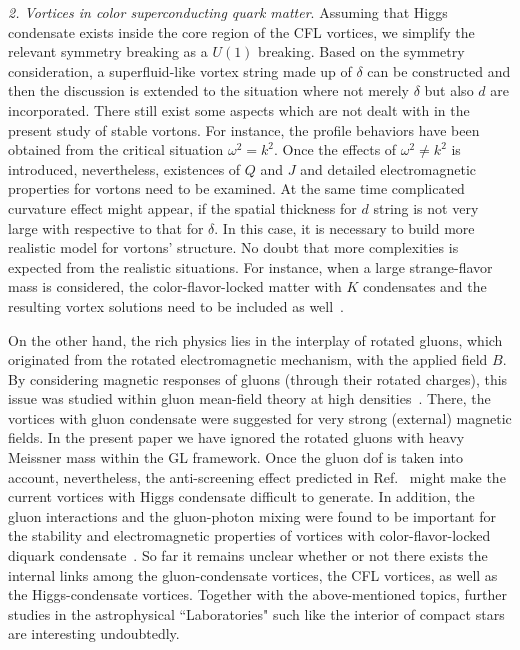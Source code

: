 \documentclass[12pt]{article}
\begin{document}
\emph{2. Vortices in color superconducting quark matter}. Assuming that Higgs condensate exists inside the core 
region of the CFL vortices, we simplify the relevant symmetry breaking as a $U(1)$ breaking. Based on the symmetry 
consideration, a superfluid-like vortex string made up of $\delta$ can be constructed and then the discussion is 
extended to the situation where not merely $\delta$ but also $d$ are incorporated.
There still exist some aspects which are not dealt with in the present study of stable vortons.
For instance, the profile behaviors have been obtained from the critical situation $\omega^2 = k^2$.
Once the effects of $\omega^2\neq k^2$ is introduced, nevertheless, existences of $Q$ and $J$ and 
detailed electromagnetic properties for vortons need to be examined.
At the same time complicated curvature effect might appear, if the spatial thickness for $d$ string 
is not very large with respective to that for $\delta$. In this case, it is necessary to build more 
realistic model for vortons' structure.
No doubt that more complexities is expected from the realistic situations. 
For instance, when a large strange-flavor mass is considered, the color-flavor-locked matter with $K$ 
condensates and the resulting vortex solutions need to be included as well~\cite{kaplan2002charged,buckley2002superconducting}.

On the other hand, the rich physics lies in the interplay of rotated gluons, which originated 
from the rotated electromagnetic mechanism, with the applied field $B$.
By considering magnetic responses of gluons (through their rotated charges), this issue was studied 
within gluon mean-field theory at high densities~\cite{ferrer2006magnetic}.
There, the vortices with gluon condensate were suggested for very strong (external) magnetic fields.
In the present paper we have ignored the rotated gluons with heavy Meissner mass within the GL framework.
Once the gluon dof is taken into account, nevertheless, the anti-screening effect predicted in 
Ref.~\cite{ferrer2006magnetic} might make the current vortices with 
Higgs condensate difficult to generate.
In addition, the gluon interactions and the gluon-photon mixing were found to be important for the 
stability and electromagnetic properties of vortices with color-flavor-locked diquark condensate~\cite{vinci2012spontaneous,eto2010instabilities,iida2005magnetic}.
So far it remains unclear whether or not there exists the internal links among the gluon-condensate vortices, 
the CFL vortices, as well as the Higgs-condensate vortices. Together with the above-mentioned topics, further 
studies in the astrophysical ``Laboratories" such like the interior of compact stars are interesting undoubtedly.
\end{document}
